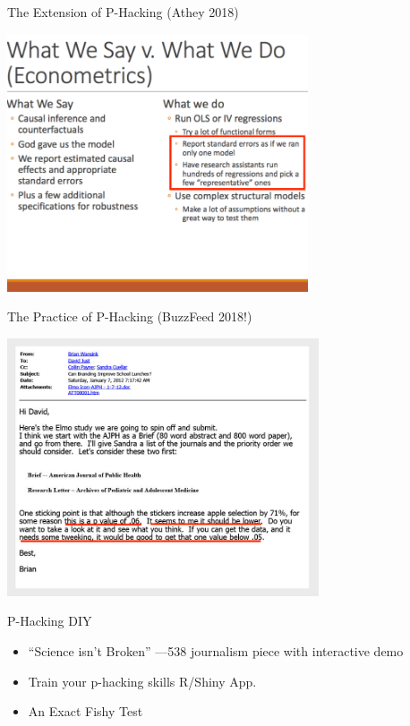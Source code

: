 \documentclass{beamer}
\begin{document}
\begin{frame}{The Extension of P-Hacking (Athey 2018)}

\includegraphics[height=3in]{../Images/athey.PNG}

\end{frame}

\begin{frame}{The Practice of P-Hacking (BuzzFeed 2018!)}

\includegraphics[height=3in]{../Images/phacking.PNG}

\end{frame}

\begin{frame}{P-Hacking DIY}
\begin{itemize}
\item
``Science isn't Broken'' ---538 journalism piece with interactive demo \href{http://fivethirtyeight.com/features/science-isnt-broken}{}
\item 
Train your p-hacking skills R/Shiny App. \href{http://www.nicebread.de/introducing-p-hacker/}{}
\item
An Exact Fishy Test \href{https://macartan.shinyapps.io/fish/}{}
\end{itemize}
\end{frame}
\end{document}
